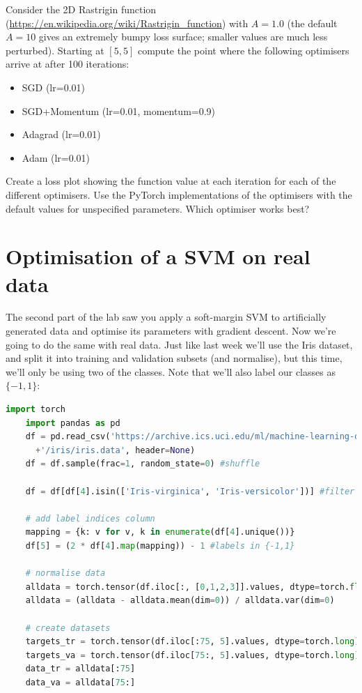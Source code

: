 \documentclass[a4paper]{article}
\begin{document}
\begin{tcolorbox}[title=1.1 Rastrigin (3 marks)]
Consider the 2D Rastrigin function (\url{https://en.wikipedia.org/wiki/Rastrigin_function}) with $A=1.0$ (the default $A=10$ gives an extremely bumpy loss surface; smaller values are much less perturbed). Starting at $[5, 5]$ compute the point where the following optimisers arrive at after 100 iterations:

\begin{itemize}
	\item SGD (lr=0.01)
	\item SGD+Momentum (lr=0.01, momentum=0.9)
	\item Adagrad (lr=0.01)
	\item Adam (lr=0.01)
\end{itemize}

Create a loss plot showing the function value at each iteration for each of the different optimisers. Use the PyTorch implementations of the optimisers with the default values for unspecified parameters. Which optimiser works best?
\end{tcolorbox}

\section{Optimisation of a SVM on real data}\label{SVM}
The second part of the lab saw you apply a soft-margin SVM to artificially generated data and optimise its parameters with gradient descent. Now we're going to do the same with real data. Just like last week we'll use the Iris dataset, and split it into training and validation subsets (and normalise), but this time, we'll only be using two of the classes. Note that we'll also label our classes as $\{-1,1\}$:

\begin{lstlisting}[language=Python]
	import torch
	import pandas as pd
	df = pd.read_csv('https://archive.ics.uci.edu/ml/machine-learning-databases'
	  +'/iris/iris.data', header=None)
	df = df.sample(frac=1, random_state=0) #shuffle

	df = df[df[4].isin(['Iris-virginica', 'Iris-versicolor'])] #filter

	# add label indices column
	mapping = {k: v for v, k in enumerate(df[4].unique())}  
	df[5] = (2 * df[4].map(mapping)) - 1 #labels in {-1,1}

	# normalise data
	alldata = torch.tensor(df.iloc[:, [0,1,2,3]].values, dtype=torch.float)
	alldata = (alldata - alldata.mean(dim=0)) / alldata.var(dim=0)

	# create datasets
	targets_tr = torch.tensor(df.iloc[:75, 5].values, dtype=torch.long)
	targets_va = torch.tensor(df.iloc[75:, 5].values, dtype=torch.long)
	data_tr = alldata[:75]
	data_va = alldata[75:]
\end{lstlisting}
\end{document}
